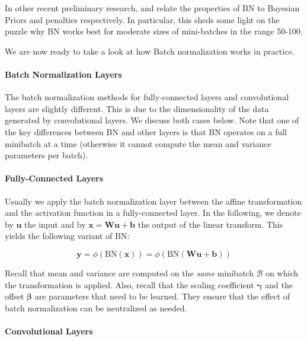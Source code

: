 In other recent preliminary research, \citet{Teye2018} and \citet{Luo2019} relate the properties of BN to Bayesian Priors and penalties respectively. 
In particular, this sheds some light on the puzzle why BN works best for moderate sizes of mini-batches in the range 50-100.

We are now ready to take a look at how Batch normalization works in practice.

\paragraph{Batch Normalization Layers}

The batch normalization methods for fully-connected layers and convolutional layers are slightly different. This is due to the dimensionality of the data generated by convolutional layers. We discuss both cases below. Note that one of the key differences between BN and other layers is that BN operates on a full minibatch at a time (otherwise it cannot compute the mean and variance parameters per batch).

\paragraph{Fully-Connected Layers}

Usually we apply the batch normalization layer between the affine transformation and the activation function in a fully-connected layer. In the following, we denote by $\mathbf{u}$ the input and by $\mathbf{x} = \mathbf{W}\mathbf{u} + \mathbf{b}$ the output of the linear transform. This yields the following variant of BN:

$$\mathbf{y} = \phi(\mathrm{BN}(\mathbf{x})) =  \phi(\mathrm{BN}(\mathbf{W}\mathbf{u} + \mathbf{b}))$$

Recall that mean and variance are computed on the \textit{same} minibatch $\mathcal{B}$ on which the transformation is applied. Also, recall that the scaling coefficient $\mathbf{\gamma}$ and the offset $\mathbf{\beta}$ are parameters that need to be learned. They ensure that the effect of batch normalization can be neutralized as needed.

\paragraph{Convolutional Layers}

